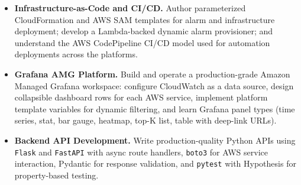 \begin{itemize}
\begin{itemize}
              \item \textbf{Errors} --- rate of failed requests; HTTP 5xx,
                    4xx, and 3xx error rates tracked as a percentage;
                    3--5\% threshold for SLO compliance, above 5\%
                    indicates a service or deployment issue.

              \item \textbf{Saturation} --- how full the system is; CPU,
                    memory, thread count, and database connection counts;
                    CPU at 95\% signals capacity risk; used for bottleneck
                    prediction and capacity planning.
          \end{itemize}

          Beyond the four golden signals, learning goals included
          understanding key observability metrics for each AWS service
          on the dashboard --- MSK consumer lag, SQS queue depth and
          oldest message age, ECS task CPU and memory, Lambda duration
          and concurrent executions, EC2 CPU and network, OpenSearch
          JVM heap pressure, and Redis memory utilization --- as well as
          evaluating advanced observability tooling including AWS X-Ray
          (distributed tracing), AWS Application Signals (SLO management),
          Grafana Trace Maps, and improvement opportunities for the
          existing IA ML/LLM RPA Support Agent.

    \item \textbf{Infrastructure-as-Code and CI/CD.}
          Author parameterized CloudFormation and AWS SAM templates for
          alarm and infrastructure deployment; develop a Lambda-backed
          dynamic alarm provisioner; and understand the AWS CodePipeline
          CI/CD model used for automation deployments across the platforms.

    \item \textbf{Grafana AMG Platform.}
          Build and operate a production-grade Amazon Managed Grafana
          workspace: configure CloudWatch as a data source, design
          collapsible dashboard rows for each AWS service, implement
          platform template variables for dynamic filtering, and learn
          Grafana panel types (time series, stat, bar gauge, heatmap,
          top-K list, table with deep-link URLs).

    \item \textbf{Backend API Development.}
          Write production-quality Python APIs using \texttt{Flask} and
          \texttt{FastAPI} with async route handlers, \texttt{boto3} for
          AWS service interaction, Pydantic for response validation, and
          \texttt{pytest} with Hypothesis for property-based testing.


\end{itemize}

